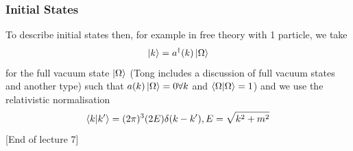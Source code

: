 \documentclass{article}
\theoremstyle{definition}
\begin{document}
\subsubsection{Initial States}

To describe initial states then, for example in free theory with 1 particle, we
take
\begin{equation}
  \ket{k} = a^\dagger(k) \ket{\Omega}
\end{equation}
for the full vacuum state $\ket{\Omega}$ (Tong includes a discussion of full
vacuum states and another type) such that $a(k) \ket{\Omega} = 0 \forall k$ and
$\bra{\Omega} \ket{\Omega} = 1$) and we use the relativistic normalisation
\begin{equation}
  \bra{k} \ket{k'} = (2\pi)^3 (2E) \delta(k - k'), E = \sqrt{k^2 + m^2}
\end{equation}
[End of lecture 7]
\end{document}
